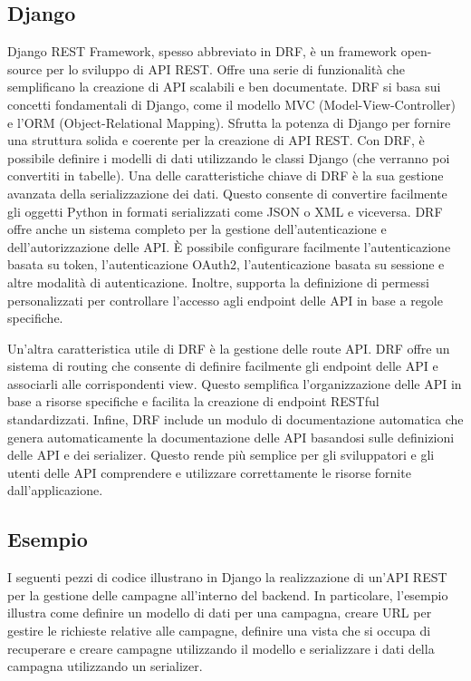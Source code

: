 \subsection{Django}
Django REST Framework, spesso abbreviato in DRF, è un framework 
open-source per lo sviluppo di API REST. Offre una serie di funzionalità 
che semplificano la creazione di API scalabili e ben documentate.
DRF si basa sui concetti fondamentali di Django, come il modello 
MVC (Model-View-Controller) e l'ORM (Object-Relational Mapping). 
Sfrutta la potenza di Django per fornire una struttura solida e coerente 
per la creazione di API REST. Con DRF, è possibile definire i modelli di 
dati utilizzando le classi Django (che verranno poi convertiti in tabelle). 
Una delle caratteristiche chiave di DRF è la sua gestione avanzata della 
serializzazione dei dati. Questo consente di convertire facilmente gli 
oggetti Python in formati serializzati come JSON o XML e viceversa. 
DRF offre anche un sistema completo per la gestione dell'autenticazione 
e dell'autorizzazione delle API. È possibile configurare facilmente 
l'autenticazione basata su token, l'autenticazione OAuth2, l'autenticazione 
basata su sessione e altre modalità di autenticazione. Inoltre, supporta la 
definizione di permessi personalizzati per controllare l'accesso agli 
endpoint delle API in base a regole specifiche.

Un'altra caratteristica utile di DRF è la gestione delle route API. 
DRF offre un sistema di routing che consente di definire 
facilmente gli endpoint delle API e associarli alle corrispondenti view. 
Questo semplifica l'organizzazione delle API in base a risorse specifiche 
e facilita la creazione di endpoint RESTful standardizzati.
Infine, DRF include un modulo di documentazione automatica che genera 
automaticamente la documentazione delle API basandosi sulle definizioni 
delle API e dei serializer. Questo rende più semplice per gli sviluppatori 
e gli utenti delle API comprendere e utilizzare correttamente le risorse 
fornite dall'applicazione. ~\cite{wiki:django}\\


\subsection{Esempio}
I seguenti pezzi di codice illustrano in Django la realizzazione di 
un'API REST per la gestione delle campagne all'interno del backend.
In particolare, l'esempio illustra come definire un modello di dati per una 
campagna, creare URL per gestire le richieste relative alle campagne, definire 
una vista che si occupa di recuperare e creare campagne utilizzando il modello 
e serializzare i dati della campagna utilizzando un serializer.

